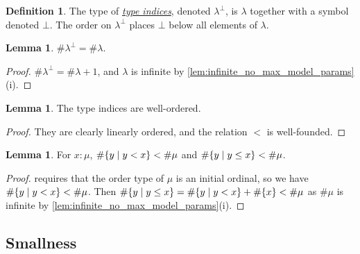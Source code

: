 \documentclass{article}
\newcommand{\cdef}[3]{\href{https://leanprover-community.github.io/con-nf/doc/ConNF/#1.html\#ConNF.#2}{\emph{#3}}}
\theoremstyle{definition}
\newtheorem{definition}{Definition}[section]
\newtheorem{lemma}[theorem]{Lemma}
\theoremstyle{remark}
\begin{document}
\begin{definition}
    The type of \cdef{BaseType/Params}{TypeIndex}{type indices}, denoted \( \lambda^\bot \), is \( \lambda \) together with a symbol denoted \( \bot \).
    The order on \( \lambda^\bot \) places \( \bot \) below all elements of \( \lambda \).
\end{definition}
\begin{lemma}
    \label{lem:mk_typeIndex}
    \( \#\lambda^\bot = \#\lambda \).
\end{lemma}
\begin{proof}
    \( \#\lambda^\bot = \#\lambda + 1 \), and \( \lambda \) is infinite by \cref{lem:infinite_no_max_model_params}(i).
\end{proof}
\begin{lemma}
    \label{lem:typeIndex_wf}
    The type indices are well-ordered.
\end{lemma}
\begin{proof}
    They are clearly linearly ordered, and the relation \( < \) is well-founded.
\end{proof}
\begin{lemma}
    \label{lem:card_Iio_lt}
    For \( x : \mu \), \( \#\qty{y \mid y < x} < \#\mu \) and \( \#\qty{y \mid y \leq x} < \#\mu \).
\end{lemma}
\begin{proof}
     requires that the order type of \( \mu \) is an initial ordinal, so we have \( \#\qty{y \mid y < x} < \#\mu \).
    Then \( \#\qty{y \mid y \leq x} = \#\qty{y \mid y < x} + \#\qty{x} < \#\mu \) as \( \#\mu \) is infinite by \cref{lem:infinite_no_max_model_params}(i).
\end{proof}

\subsection{Smallness}
\end{document}
